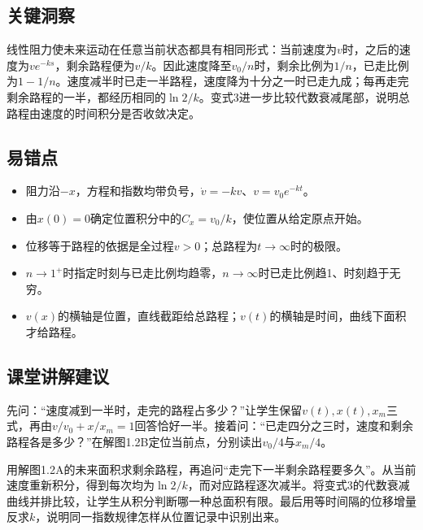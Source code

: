 \documentclass[UTF8,fontset=fandol,a4paper,11pt]{ctexart}
\begin{document}


\subsection*{关键洞察}

线性阻力使未来运动在任意当前状态都具有相同形式：当前速度为$v$时，之后的速度为$ve^{-ks}$，剩余路程便为$v/k$。因此速度降至$v_0/n$时，剩余比例为$1/n$，已走比例为$1-1/n$。速度减半时已走一半路程，速度降为十分之一时已走九成；每再走完剩余路程的一半，都经历相同的$\ln2/k$。变式3进一步比较代数衰减尾部，说明总路程由速度的时间积分是否收敛决定。



\subsection*{易错点}

\begin{itemize}
\item 阻力沿$-x$，方程和指数均带负号，$\dot v=-kv$、$v=v_0e^{-kt}$。
\item 由$x(0)=0$确定位置积分中的$C_x=v_0/k$，使位置从给定原点开始。
\item 位移等于路程的依据是全过程$v>0$；总路程为$t\to\infty$时的极限。
\item $n\to1^+$时指定时刻与已走比例均趋零，$n\to\infty$时已走比例趋1、时刻趋于无穷。
\item $v(x)$的横轴是位置，直线截距给总路程；$v(t)$的横轴是时间，曲线下面积才给路程。
\end{itemize}



\subsection*{课堂讲解建议}

先问：“速度减到一半时，走完的路程占多少？”让学生保留$v(t),x(t),x_m$三式，再由$v/v_0+x/x_m=1$回答恰好一半。接着问：“已走四分之三时，速度和剩余路程各是多少？”在解图1.2B定位当前点，分别读出$v_0/4$与$x_m/4$。

用解图1.2A的未来面积求剩余路程，再追问“走完下一半剩余路程要多久”。从当前速度重新积分，得到每次均为$\ln2/k$，而对应路程逐次减半。将变式3的代数衰减曲线并排比较，让学生从积分判断哪一种总面积有限。最后用等时间隔的位移增量反求$k$，说明同一指数规律怎样从位置记录中识别出来。
\end{document}
